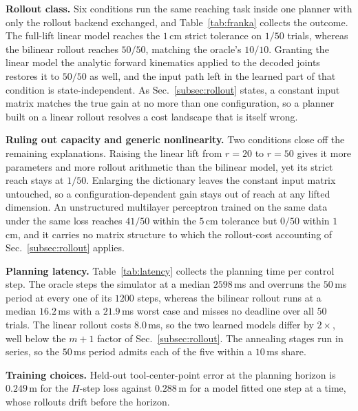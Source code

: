\documentclass[letterpaper,10pt,conference]{ieeeconf}
\begin{document}
\textbf{Rollout class.}
Six conditions run the same reaching task inside one planner with only the rollout backend exchanged, and Table~\ref{tab:franka} collects the outcome.
The full-lift linear model reaches the $1$\,cm strict tolerance on $1/50$ trials, whereas the bilinear rollout reaches $50/50$, matching the oracle's $10/10$.
Granting the linear model the analytic forward kinematics applied to the decoded joints restores it to $50/50$ as well, and the input path left in the learned part of that condition is state-independent.
As Sec.~\ref{subsec:rollout} states, a constant input matrix matches the true gain at no more than one configuration, so a planner built on a linear rollout resolves a cost landscape that is itself wrong.

\textbf{Ruling out capacity and generic nonlinearity.}
Two conditions close off the remaining explanations.
Raising the linear lift from $r=20$ to $r=50$ gives it more parameters and more rollout arithmetic than the bilinear model, yet its strict reach stays at $1/50$.
Enlarging the dictionary leaves the constant input matrix untouched, so a configuration-dependent gain stays out of reach at any lifted dimension.
An unstructured multilayer perceptron trained on the same data under the same loss reaches $41/50$ within the $5$\,cm tolerance but $0/50$ within $1$\,cm, and it carries no matrix structure to which the rollout-cost accounting of Sec.~\ref{subsec:rollout} applies.

\textbf{Planning latency.}
Table~\ref{tab:latency} collects the planning time per control step.
The oracle steps the simulator at a median $2598$\,ms and overruns the $50$\,ms period at every one of its $1200$ steps, whereas the bilinear rollout runs at a median $16.2$\,ms with a $21.9$\,ms worst case and misses no deadline over all $50$ trials.
The linear rollout costs $8.0$\,ms, so the two learned models differ by $2\times$, well below the $m+1$ factor of Sec.~\ref{subsec:rollout}.
The annealing stages run in series, so the $50$\,ms period admits each of the five within a $10$\,ms share.

\textbf{Training choices.}
Held-out tool-center-point error at the planning horizon is $0.249$\,m for the $H$-step loss against $0.288$\,m for a model fitted one step at a time, whose rollouts drift before the horizon.
\end{document}
